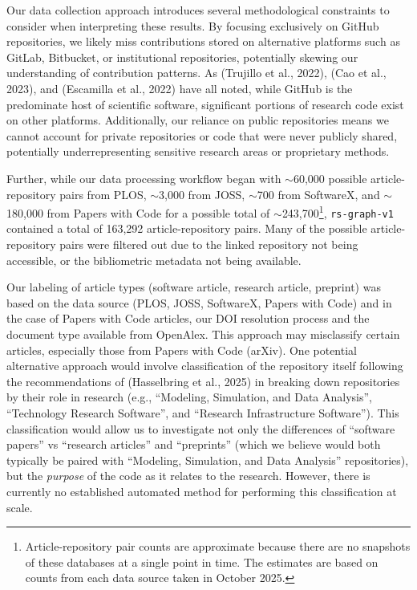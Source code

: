 \documentclass[
  number,
  3p,
  onecolumn]{elsarticle}
\begin{document}
Our data collection approach introduces several methodological
constraints to consider when interpreting these results. By focusing
exclusively on GitHub repositories, we likely miss contributions stored
on alternative platforms such as GitLab, Bitbucket, or institutional
repositories, potentially skewing our understanding of contribution
patterns. As (Trujillo et al., 2022), (Cao et al., 2023), and (Escamilla
et al., 2022) have all noted, while GitHub is the predominate host of
scientific software, significant portions of research code exist on
other platforms. Additionally, our reliance on public repositories means
we cannot account for private repositories or code that were never
publicly shared, potentially underrepresenting sensitive research areas
or proprietary methods.

Further, while our data processing workflow began with
$\sim$60,000 possible article-repository pairs from PLOS,
$\sim$3,000 from JOSS, $\sim$700 from SoftwareX, and
$\sim$180,000 from Papers with Code for a possible total of
$\sim$243,700\footnote{Article-repository pair counts are
  approximate because there are no snapshots of these databases at a
  single point in time. The estimates are based on counts from each data
  source taken in October 2025.}, \texttt{rs-graph-v1} contained a total
of 163,292 article-repository pairs. Many of the possible
article-repository pairs were filtered out due to the linked repository
not being accessible, or the bibliometric metadata not being available.

Our labeling of article types (software article, research article,
preprint) was based on the data source (PLOS, JOSS, SoftwareX, Papers
with Code) and in the case of Papers with Code articles, our DOI
resolution process and the document type available from OpenAlex. This
approach may misclassify certain articles, especially those from Papers
with Code (arXiv). One potential alternative approach would involve
classification of the repository itself following the recommendations of
(Hasselbring et al., 2025) in breaking down repositories by their role
in research (e.g., ``Modeling, Simulation, and Data Analysis'',
``Technology Research Software'', and ``Research Infrastructure
Software''). This classification would allow us to investigate not only
the differences of ``software papers'' vs ``research articles'' and
``preprints'' (which we believe would both typically be paired with
``Modeling, Simulation, and Data Analysis'' repositories), but the
\emph{purpose} of the code as it relates to the research. However, there
is currently no established automated method for performing this
classification at scale.
\end{document}

